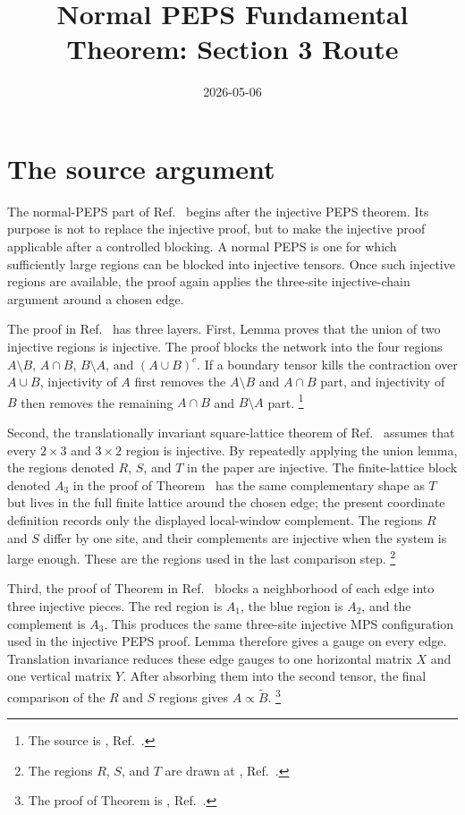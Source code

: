 \documentclass{article}
\title{Normal PEPS Fundamental Theorem: Section 3 Route}
\author{}
\date{2026-05-06}
\begin{document}
\maketitle
{}

\section{The source argument}

The normal-PEPS part of Ref.~\cite{Molnar2018NormalPEPS} begins after the
injective PEPS theorem. Its purpose is not to replace the injective proof, but
to make
the injective proof applicable after a controlled blocking. A normal PEPS is
one for which sufficiently large regions can be blocked into injective tensors.
Once such injective regions are available, the proof again applies the
three-site injective-chain argument around a chosen edge.

The proof in Ref.~\cite{Molnar2018NormalPEPS} has three layers. First, Lemma
 proves
that the union of two injective regions is injective. The proof blocks the
network into the four regions $A\setminus B$, $A\cap B$,
$B\setminus A$, and $(A\cup B)^c$. If a boundary tensor kills the
contraction over $A\cup B$, injectivity of $A$ first removes the
$A\setminus B$ and $A\cap B$ part, and injectivity of $B$ then removes
the remaining $A\cap B$ and $B\setminus A$ part.
\footnote{The source is
    , Ref.~\cite{Molnar2018NormalPEPS}.}

Second, the translationally invariant square-lattice theorem of
Ref.~\cite{Molnar2018NormalPEPS} assumes that every $2\times 3$ and
$3\times 2$ region is injective. By
repeatedly applying the union lemma, the regions denoted $R$, $S$, and $T$
in the paper are injective. The finite-lattice block denoted $A_3$ in the proof
of Theorem~ has the same complementary shape as $T$ but lives in the
full finite lattice around the chosen edge; the present coordinate definition
records only the displayed local-window complement. The regions $R$ and $S$
differ by one site, and their complements are injective when the system is
large enough. These are the regions used in the last comparison step.
\footnote{The regions $R$, $S$, and $T$ are drawn at
    , Ref.~\cite{Molnar2018NormalPEPS}.}

Third, the proof of Theorem  in
Ref.~\cite{Molnar2018NormalPEPS} blocks a neighborhood of each edge into
three injective pieces. The red region is $A_1$, the blue region is $A_2$,
and the complement is $A_3$. This produces the same three-site injective MPS
configuration used in the injective PEPS proof. Lemma 
therefore gives a gauge on every edge. Translation invariance reduces these
edge gauges to one horizontal matrix $X$ and one vertical matrix $Y$. After
absorbing them into the second tensor, the final comparison of the $R$ and
$S$ regions gives $A\propto \widetilde B$.
\footnote{The proof of Theorem  is
    , Ref.~\cite{Molnar2018NormalPEPS}.}
\end{document}
